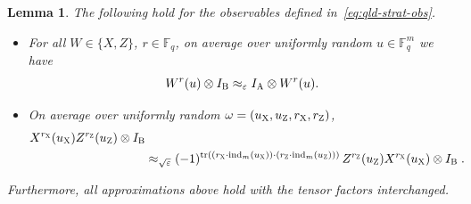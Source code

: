 \documentclass[11pt]{article}
\newtheorem{lemma}[theorem]{Lemma}
\theoremstyle{definition}
\newcommand{\Id}{\ensuremath{I}}
\newcommand{\F}{\ensuremath{\mathbb{F}}}
\newcommand{\ind}{\ensuremath{\mathrm{ind}}}
\newcommand{\eps}{\varepsilon}
\DeclareMathOperator{\tr}{tr}
\newcommand{\labelstyle}[1]{\ensuremath{\textsc{#1}}\xspace}
\newcommand{\xpt}{\labelstyle{X}}
\newcommand{\zpt}{\labelstyle{Z}}
\newcommand{\alice}{\labelstyle{A}}
\newcommand{\bob}{\labelstyle{B}}
\begin{document}
\begin{lemma}
\label{len:qld-win-implications-obs}The following hold for the observables defined in~\eqref{eq:qld-strat-obs}. 
	\begin{itemize}
		\item For all $W \in \{X,Z\}$, $r \in \F_q$, on average over uniformly random $u \in \F_q^m$ we have
		\begin{equation}
		\label{eq:pts-obs-consistency}
			W^r(u) \otimes \Id_\bob \approx_\eps \Id_\alice \otimes W^r(u).
		\end{equation}
		\item On average over uniformly random $\omega = (u_\xpt,u_\zpt,r_\xpt,r_\zpt)$, 
		\begin{align}
			X^{r_\xpt}(u_\xpt)
                        Z^{r_\zpt}(u_\zpt) \otimes \Id_\bob\notag\\
												&       \approx_{\sqrt{\eps}} (-1)^{\tr ((r_\xpt \cdot
                          \ind_m(u_\xpt)) \cdot (r_\zpt \cdot \ind_m(u_\zpt)))} \, Z^{r_\zpt}(u_\zpt) X^{r_\xpt}(u_\xpt) \otimes \Id_\bob	\;.	\label{eq:pts-obs-commutation}
		\end{align}
	\end{itemize}
	Furthermore, all approximations above hold with the tensor factors interchanged.
\end{lemma}
\end{document}
